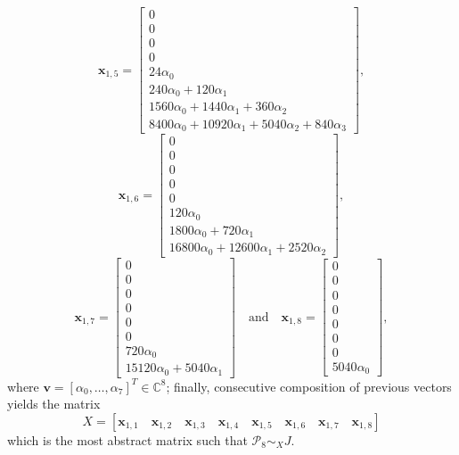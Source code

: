 \begin{example}
\begin{displaymath}
\end{displaymath}
\begin{displaymath}
\boldsymbol{x}_{1,5} = \left[\begin{matrix}0\\0\\0\\0\\24 \alpha_{0}\\240 \alpha_{0} + 120 \alpha_{1}\\1560 \alpha_{0} + 1440 \alpha_{1} + 360 \alpha_{2}\\8400 \alpha_{0} + 10920 \alpha_{1} + 5040 \alpha_{2} + 840 \alpha_{3}\end{matrix}\right],
\end{displaymath}
\begin{displaymath}
\boldsymbol{x}_{1,6} = \left[\begin{matrix}0\\0\\0\\0\\0\\120 \alpha_{0}\\1800 \alpha_{0} + 720 \alpha_{1}\\16800 \alpha_{0} + 12600 \alpha_{1} + 2520 \alpha_{2}\end{matrix}\right],
\end{displaymath}
\begin{displaymath}
\boldsymbol{x}_{1,7} = \left[\begin{matrix}0\\0\\0\\0\\0\\0\\720 \alpha_{0}\\15120 \alpha_{0} + 5040 \alpha_{1}\end{matrix}\right]
\quad\text{and}\quad \boldsymbol{x}_{1,8} = \left[\begin{matrix}0\\0\\0\\0\\0\\0\\0\\5040 \alpha_{0}\end{matrix}\right],
\end{displaymath}
where $\boldsymbol{v} = [\alpha_{0}, \ldots, \alpha_{7}]^{T} \in \mathbb{C}^{8}$;
finally, consecutive composition of previous vectors yields the matrix 
$$X = \left[\boldsymbol{x}_{1,1}\quad\boldsymbol{x}_{1,2}\quad
\boldsymbol{x}_{1,3}\quad\boldsymbol{x}_{1,4}\quad
\boldsymbol{x}_{1,5}\quad\boldsymbol{x}_{1,6}\quad\boldsymbol{x}_{1,7}\quad
\boldsymbol{x}_{1,8}\right]$$ 
which is the most abstract matrix such that $\mathcal{P}_{8} \sim_{X} J$.
\end{example}

